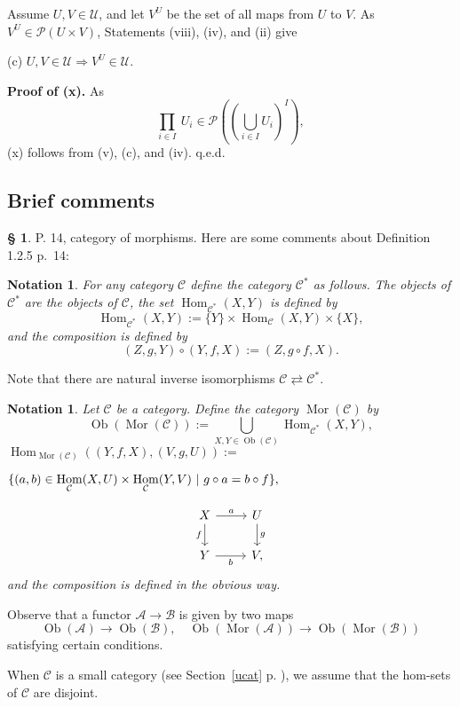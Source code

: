\documentclass[12pt]{article}%
\newtheorem{nota}[thm]{Notation}
\theoremstyle{remark}
\theoremstyle{definition}
\newtheorem{s}[thm]{\S}%
\newcommand{\nn}{\noindent}
\newcommand{\A}{\mathcal A}
\newcommand{\B}{\mathcal B}
\newcommand{\C}{\mathcal C}
\newcommand{\then}{\Rightarrow}
\DeclareMathOperator{\Hom}{Hom}%
\DeclareMathOperator{\Mor}{Mor}
\DeclareMathOperator{\Ob}{Ob}
\begin{document}
Assume $U,V\in\mathcal U$, and let $V^U$ be the set of all maps from $U$ to $V$. As $V^U\in\mathcal P(U\times V)$, Statements (viii), (iv), and (ii) give

(c) $U,V\in\mathcal U\then V^U\in\mathcal U$.

\noindent\textbf{Proof of (x).} As 
$$
\prod_{i\in I}\ U_i\in\mathcal P\left(\left(\bigcup_{i\in I}U_i\right)^I\right),
$$
(x) follows from (v), (c), and (iv). q.e.d.


\subsection{Brief comments}

\begin{s}\label{d125}
P. 14, category of morphisms. Here are some comments about Definition 1.2.5 p.~14:

\begin{nota}\label{c*}
For any category $\C$ define the category $\C^*$ as follows. The objects of $\C^*$ are the objects of $\C$, the set $\Hom_{\C^*}(X,Y)$ is defined by 
$$
\Hom_{\C^*}(X,Y):=\{Y\}\times\Hom_{\C}(X,Y)\times\{X\},
$$
and the composition is defined by 
$$
(Z,g,Y)\circ(Y,f,X):=(Z,g\circ f,X).
$$ 
\end{nota}

Note that there are natural inverse isomorphisms $\C\rightleftarrows\C^*$. 

\begin{nota}\label{mor}
%
Let $\C$ be a category. Define the category $\Mor(\C)$ \index{$\Mor$} by 
$$
\Ob(\Mor(\C)):=\bigcup_{X,Y\in\Ob(\C)}\Hom_{\C^*}(X,Y),
$$
$\displaystyle \Hom_{\Mor(\C)}((Y,f,X),(V,g,U)):=$\bigskip 

$\hfill\displaystyle\{(a,b)\in\Hom_\C(X,U)\times\Hom_\C(Y,V)\ | \ g\circ a=b\circ f\},$\bigskip

\nn{\em i.e.} 
$$
\begin{tikzcd}
X\ar{d}[swap]{f}\ar{r}{a}&U\ar{d}{g}\\ 
Y\ar{r}[swap]{b}&V,
\end{tikzcd}
$$ 
and the composition is defined in the obvious way.
\end{nota}

Observe that a functor $\A\to\B$ is given by two maps 
$$
\Ob(\A)\to\Ob(\B),\quad\Ob(\Mor(\A))\to\Ob(\Mor(\B))
$$ 
satisfying certain conditions.

When $\C$ is a small category (see Section~\ref{ucat} p. \pageref{ucat}), we assume that the hom-sets of $\C$ are disjoint.
\end{s}
\end{document}
